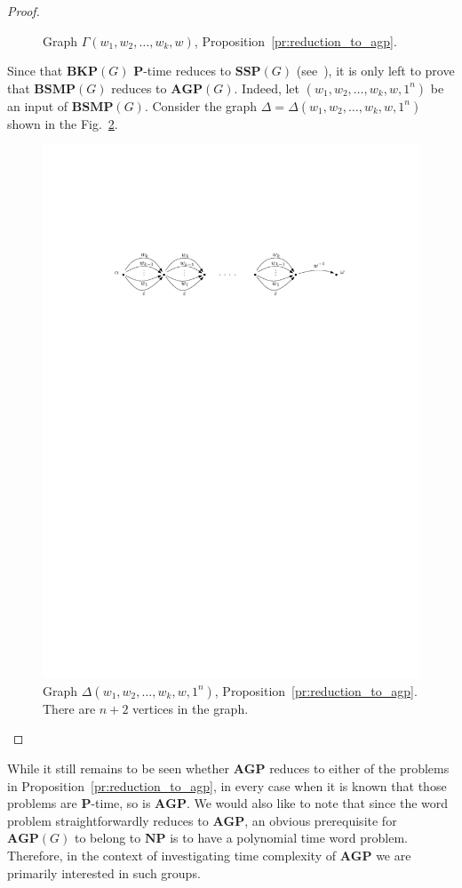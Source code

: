 \documentclass[10pt]{amsart}
\theoremstyle{definition}
\def\P{{\mathbf{P}}}
\def\NP{{\mathbf{NP}}}
\def\SSP{{\mathbf{SSP}}}
\def\BSMP{{\mathbf{BSMP}}}
\def\BKP{{\mathbf{BKP}}}
\def\AGP{{\mathbf{AGP}}}
\begin{document}
\begin{proof}
\begin{figure}[h]
 \caption{Graph $\Gamma(w_1,w_2,\ldots,w_k,w)$, Proposition~\ref{pr:reduction_to_agp}.}\label{fi:SSP}
\end{figure}
Since that $\BKP(G)$ $\P$-time reduces to $\SSP(G)$ (see~\cite{MNU1}), it is only left to prove that $\BSMP(G)$ reduces to $\AGP(G)$. Indeed, let $(w_1,w_2,\ldots,w_k,w,1^n)$ be an input of $\BSMP(G)$. Consider the graph $\Delta=\Delta(w_1,w_2,\ldots,w_k,w,1^n)$ shown in the Fig.~\ref{fi:BSMP}.
\begin{figure}[h]
 \centering
 \includegraphics[width=4.5in]{bsmp.pdf}
 \caption{Graph $\Delta(w_1,w_2,\ldots,w_k,w,1^n)$, Proposition~\ref{pr:reduction_to_agp}. There are $n+2$ vertices in the graph.}\label{fi:BSMP}
\end{figure}
\end{proof}

While it still remains to be seen whether $\AGP$ reduces to either of the problems in Proposition~\ref{pr:reduction_to_agp}, in every case when it is known that those problems are $\P$-time, so is $\AGP$. We would also like to note that since the word problem straightforwardly reduces to $\AGP$, an obvious prerequisite for $\AGP(G)$ to belong to $\NP$ is to have a polynomial time word problem. Therefore, in the context of investigating time complexity of $\AGP$ we are primarily interested in such groups.
\end{document}
